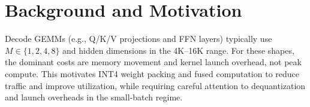 \section{Background and Motivation}
Decode GEMMs (e.g., Q/K/V projections and FFN layers) typically use $M \in
\{1,2,4,8\}$ and hidden dimensions in the 4K--16K range. For these shapes, the
dominant costs are memory movement and kernel launch overhead, not peak compute.
This motivates INT4 weight packing and fused computation to reduce traffic and
improve utilization, while requiring careful attention to dequantization and
launch overheads in the small-batch regime.
